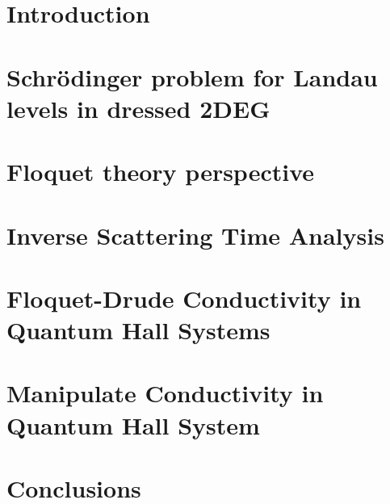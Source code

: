 \documentclass[%
 reprint,
 amsmath,amssymb,
 aps,
prb,
]{revtex4-2}
\begin{document}

\section{\label{sec:introduction} Introduction}


\section{Schrödinger problem for Landau levels in dressed 2DEG
}


\section{Floquet theory perspective}


% 

\section{Inverse Scattering Time Analysis}


% 

\section{Floquet-Drude Conductivity in Quantum Hall Systems}


\section{Manipulate Conductivity in Quantum Hall System}


\section{Conclusions}

\end{document}
